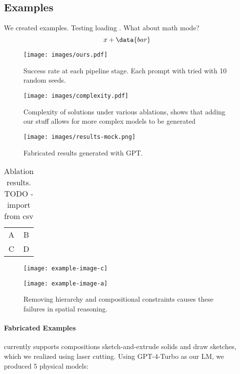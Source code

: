 \iffalse
\subsection{Examples}

We created  examples. Testing loading . What about math mode?
\[
x + \data{bar}
\]

\begin{figure}
    \centering
    \texttt{[image: images/ours.pdf]}
    \caption{Success rate at each pipeline stage. Each prompt with tried with 10 random seeds.}
    \label{fig:ours-success}
\end{figure}

\begin{figure}
    \centering
    \texttt{[image: images/complexity.pdf]}
    \caption{Complexity of solutions under various ablations, shows that adding our stuff allows for more complex models to be generated}
    \label{fig:ablation-complexity}
\end{figure}

\begin{figure*}
    \centering
    \texttt{[image: images/results-mock.png]}
    \caption{Fabricated results generated with GPT.}
    \label{fig:fabricated}
\end{figure*}

\begin{table}[h]
    \centering
    \begin{tabular}{c|c}
        A & B \\
        C & D
    \end{tabular}
    \caption{Ablation results. TODO - import from csv}
    \label{tab:ablations}
\end{table}

\begin{wrapfigure}{r}{0.25\textwidth}
    \centering
    \texttt{[image: example-image-c]}
\end{wrapfigure}

\begin{figure}
    \centering
    \texttt{[image: example-image-a]}
    \caption{Removing hierarchy and compositional constraints causes these failures in spatial reasoning.}
    \label{fig:ablation-failures}
\end{figure}


\paragraph{Fabricated Examples}
\langname{} currently supports compositions sketch-and-extrude solids and draw sketches, which we realized using laser cutting. Using GPT-4-Turbo as our LM, we produced 5 physical models:

